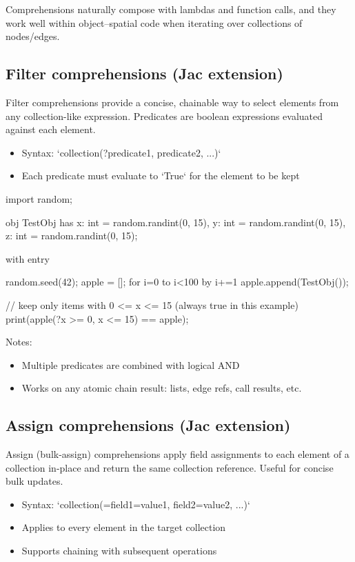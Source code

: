 Comprehensions naturally compose with lambdas and function calls, and they work well within object–spatial code when iterating over collections of nodes/edges.

\subsection{Filter comprehensions (Jac extension)}

Filter comprehensions provide a concise, chainable way to select elements from any collection-like expression. Predicates are boolean expressions evaluated against each element.

\begin{itemize}
    \item Syntax: `collection(?predicate1, predicate2, ...)`
    \item Each predicate must evaluate to `True` for the element to be kept
\end{itemize}

\begin{jacblock}
import random;

obj TestObj {
    has x: int = random.randint(0, 15),
        y: int = random.randint(0, 15),
        z: int = random.randint(0, 15);
}

with entry {
    random.seed(42);
    apple = [];
    for i=0 to i<100 by i+=1  {
        apple.append(TestObj());
    }

    // keep only items with 0 <= x <= 15 (always true in this example)
    print(apple(?x >= 0, x <= 15) == apple);
}
\end{jacblock}

Notes:
\begin{itemize}
    \item Multiple predicates are combined with logical AND
    \item Works on any atomic chain result: lists, edge refs, call results, etc.
\end{itemize}

\subsection{Assign comprehensions (Jac extension)}

Assign (bulk-assign) comprehensions apply field assignments to each element of a collection in-place and return the same collection reference. Useful for concise bulk updates.

\begin{itemize}
    \item Syntax: `collection(=field1=value1, field2=value2, ...)`
    \item Applies to every element in the target collection
    \item Supports chaining with subsequent operations
\end{itemize}

